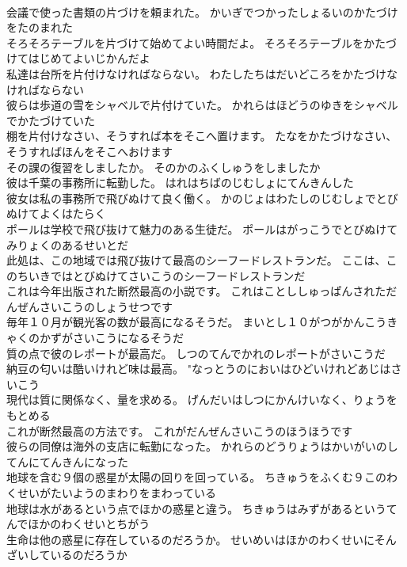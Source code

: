 \documentclass[8pt]{extreport}
\begin{document}
\begin{CJK}{UTF8}{min}
\\	会議で使った書類の片づけを頼まれた。	かいぎでつかったしょるいのかたづけをたのまれた 
\\	そろそろテーブルを片づけて始めてよい時間だよ。	そろそろテーブルをかたづけてはじめてよいじかんだよ 
\\	私達は台所を片付けなければならない。	わたしたちはだいどころをかたづけなければならない 
\\	彼らは歩道の雪をシャベルで片付けていた。	かれらはほどうのゆきをシャベルでかたづけていた 
\\	棚を片付けなさい、そうすれば本をそこへ置けます。	たなをかたづけなさい、そうすればほんをそこへおけます 
\\	その課の復習をしましたか。	そのかのふくしゅうをしましたか 
\\	彼は千葉の事務所に転勤した。	はれはちばのじむしょにてんきんした 
\\	彼女は私の事務所で飛びぬけて良く働く。	かのじょはわたしのじむしょでとびぬけてよくはたらく 
\\	ポールは学校で飛び抜けて魅力のある生徒だ。	ポールはがっこうでとびぬけてみりょくのあるせいとだ 
\\	此処は、この地域では飛び抜けて最高のシーフードレストランだ。	ここは、このちいきではとびぬけてさいこうのシーフードレストランだ 
\\	これは今年出版された断然最高の小説です。	これはことししゅっぱんされただんぜんさいこうのしょうせつです 
\\	毎年１０月が観光客の数が最高になるそうだ。	まいとし１０がつがかんこうきゃくのかずがさいこうになるそうだ 
\\	質の点で彼のレポートが最高だ。	しつのてんでかれのレポートがさいこうだ 
\\	納豆の匂いは酷いけれど味は最高。	"なっとうのにおいはひどいけれどあじはさいこう 
\\	現代は質に関係なく、量を求める。	げんだいはしつにかんけいなく、りょうをもとめる 
\\	これが断然最高の方法です。	これがだんぜんさいこうのほうほうです 
\\	彼らの同僚は海外の支店に転勤になった。	かれらのどうりょうはかいがいのしてんにてんきんになった 
\\	地球を含む９個の惑星が太陽の回りを回っている。	ちきゅうをふくむ９このわくせいがたいようのまわりをまわっている 
\\	地球は水があるという点でほかの惑星と違う。	ちきゅうはみずがあるというてんでほかのわくせいとちがう 
\\	生命は他の惑星に存在しているのだろうか。	せいめいはほかのわくせいにそんざいしているのだろうか 

\end{CJK}
\end{document}
